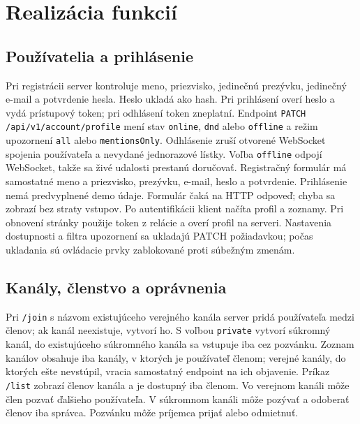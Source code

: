 \documentclass[11pt,a4paper]{article}
\begin{document}
\section{Realizácia funkcií}
\subsection{Používatelia a prihlásenie}
Pri registrácii server kontroluje meno, priezvisko, jedinečnú prezývku,
jedinečný e-mail a potvrdenie hesla. Heslo ukladá ako hash. Pri prihlásení overí heslo a vydá
prístupový token; pri odhlásení token zneplatní. Endpoint
\texttt{PATCH /api/v1/account/profile} mení stav \texttt{online},
\texttt{dnd} alebo \texttt{offline} a režim upozornení \texttt{all} alebo
\texttt{mentionsOnly}. Odhlásenie zruší otvorené WebSocket spojenia
používateľa a nevydané jednorazové lístky. Voľba \texttt{offline} odpojí
WebSocket, takže sa živé udalosti prestanú doručovať.
Registračný formulár má samostatné meno a priezvisko, prezývku,
e-mail, heslo a potvrdenie. Prihlásenie nemá predvyplnené demo údaje.
Formulár čaká na HTTP odpoveď; chyba sa zobrazí bez straty vstupov.
Po autentifikácii klient načíta profil a zoznamy. Pri obnovení stránky
použije token z relácie a overí profil na serveri. Nastavenia dostupnosti
a filtra upozornení sa ukladajú PATCH požiadavkou; počas ukladania sú
ovládacie prvky zablokované proti súbežným zmenám.

\subsection{Kanály, členstvo a oprávnenia}
Pri \texttt{/join} s názvom existujúceho verejného kanála server pridá
používateľa medzi členov; ak kanál neexistuje, vytvorí ho. S voľbou
\texttt{private} vytvorí súkromný kanál, do existujúceho súkromného kanála
sa vstupuje iba cez pozvánku. Zoznam kanálov obsahuje iba kanály, v ktorých je
používateľ členom; verejné kanály, do ktorých ešte nevstúpil, vracia
samostatný endpoint na ich objavenie. Príkaz \texttt{/list} zobrazí členov
kanála a je dostupný iba členom. Vo verejnom kanáli môže člen pozvať
ďalšieho používateľa. V súkromnom kanáli môže pozývať a odoberať členov
iba správca. Pozvánku môže príjemca prijať alebo odmietnuť.
\end{document}
